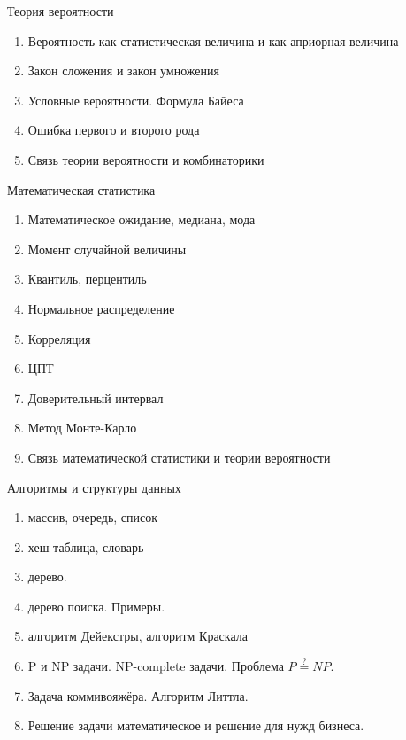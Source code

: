 \documentclass{beamer}
\newcommand{\рис}[1]{рис.\ref{#1}}
\newcommand{\Рис}[1]{Рис.\ref{#1}}
\newcommand{\таблицa}[1]{таблица~№\ref{#1}} %
\newcommand{\таблицы}[1]{таблицы~№\ref{#1}} %
\newcommand{\таблице}[1]{таблице~№\ref{#1}} %
\newcommand{\таблицу}[1]{таблицу~№\ref{#1}} %
\newcommand{\таблицей}[1]{таблицей~№\ref{#1}} %
\newcommand{\Таблицa}[1]{Таблица~№\ref{#1}} %
\newcommand{\Таблицы}[1]{Таблицы~№\ref{#1}} %
\newcommand{\Таблице}[1]{Таблице~№\ref{#1}} %
\newcommand{\Таблицу}[1]{Таблицу~№\ref{#1}} %
\newcommand{\Таблицей}[1]{Таблицей~№\ref{#1}} %
\begin{document}
  \begin{frame}{Теория вероятности}
  \begin{enumerate}
    \item Вероятность как статистическая величина и как априорная величина
    \item Закон сложения и закон умножения
    \item Условные вероятности. Формула Байеса
    \item Ошибка первого и второго рода
    \item Связь теории вероятности и комбинаторики
   \end{enumerate}
   \end{frame}
 
  \begin{frame}{Математическая статистика}
  \begin{enumerate}
    \item Математическое ожидание, медиана, мода
    \item Момент случайной величины
    \item Квантиль, перцентиль
    \item Нормальное распределение
    \item Корреляция
    \item ЦПТ
    \item Доверительный интервал
    \item Метод Монте-Карло
    \item Связь математической статистики и теории вероятности
 \end{enumerate}  
\end{frame}

  \begin{frame}{Алгоритмы и структуры данных}
   \begin{enumerate}
   	
     \item массив, очередь, список
     \item хеш-таблица, словарь
     \item дерево.
     \item дерево поиска. Примеры.
     \item алгоритм Дейекстры, алгоритм Краскала
     \item P и NP задачи. NP-complete задачи. Проблема $ P\stackrel{?}{=} NP$.
     \item Задача коммивояжёра. Алгоритм Литтла.  
     \item Решение задачи математическое и решение для нужд бизнеса.   
	\end{enumerate}
  
	\end{frame}
  
\end{document}
